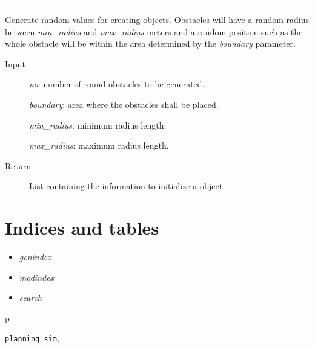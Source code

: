 \documentclass[letterpaper,10pt,english]{sphinxmanual}
\begin{document}
\bigskip\hrule{}\bigskip


\begin{fulllineitems}
\label{Multi-robot motion planner:planning_sim.rand_round_obst}
Generate random values for creating {\hyperref[Multi-robot motion planner:planning_sim.RoundObstacle]{}} objects.
Obstacles will have a random radius between \emph{min\_radius} and \emph{max\_radius}
meters and a random position such as the whole obstacle will be within the area
determined by the \emph{boundary} parameter.
\begin{description}
\item[{Input}] \leavevmode
\emph{no}: number of round obstacles to be generated.

\emph{boundary}: area where the obstacles shall be placed.

\emph{min\_radius}: minimum radius length.

\emph{max\_radius}: maximum radius length.

\item[{Return}] \leavevmode
List containing the information to initialize a {\hyperref[Multi-robot motion planner:planning_sim.RoundObstacle]{}} object.

\end{description}

\end{fulllineitems}



\chapter{Indices and tables}
\label{index:indices-and-tables}\begin{itemize}
\item {} 
\emph{genindex}

\item {} 
\emph{modindex}

\item {} 
\emph{search}

\end{itemize}


\renewcommand{\indexname}{Python Module Index}
\begin{theindex}
\def\bigletter#1{{\Large\sffamily#1}\nopagebreak\vspace{1mm}}
\bigletter{p}
\item {\texttt{planning\_sim}}, \pageref{Multi-robot motion planner:module-planning_sim}
\end{theindex}

\renewcommand{\indexname}{Index}
\printindex
\end{document}
